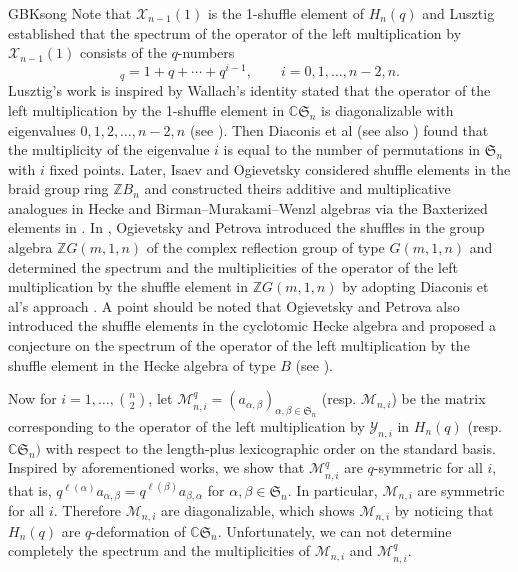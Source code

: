 \documentclass[13pt,a4paper, oneside]{amsart}       %
\numberwithin{equation}{section}
\theoremstyle{definition}
\theoremstyle{remark}
\begin{document}
\begin{CJK*}{GBK}{song}
Note that $\mathscr{X}_{n-1}(1)$ is the 1-shuffle element of $H_n(q)$ and Lusztig \cite{Lusztig} established that the spectrum of the operator of the left multiplication by $\mathscr{X}_{n-1}(1)$ consists of the $q$-numbers
 \begin{equation*}
[i]_q=1+q+\cdots+q^{i-1},\qquad i=0,1,\ldots,n-2,n.
\end{equation*}
Lusztig's work is inspired by Wallach's identity stated that the operator of the left multiplication by the 1-shuffle element in $\mathbb{C}\mathfrak{S}_n$ is diagonalizable with eigenvalues $0,1,2,\ldots, n-2,n$ (see \cite[Proposition~A.1]{Wallach}). Then Diaconis et al \cite{Diaconis-Fill-Pitman} (see also \cite{Phatarfod}) found that the multiplicity of the eigenvalue $i$ is equal to the number of permutations in $\mathfrak{S}_n$ with $i$ fixed points. Later, Isaev and Ogievetsky considered shuffle elements in the braid group ring $\mathbb{Z}B_n$ and constructed theirs additive and multiplicative analogues in Hecke and Birman--Murakami--Wenzl algebras via the Baxterized elements in \cite{Isaev-O}. In \cite{O-Petrova}, Ogievetsky and Petrova introduced the shuffles in the group algebra $\mathbb{Z}G(m,1,n)$ of the complex reflection group of type $G(m,1,n)$ and determined the spectrum and the multiplicities of the operator of the left multiplication by the shuffle element in $\mathbb{Z}G(m,1,n)$
by adopting Diaconis et al's approach \cite{Diaconis-Fill-Pitman}. A point should be noted that Ogievetsky and Petrova also introduced the shuffle elements in the cyclotomic Hecke algebra and proposed a conjecture on the spectrum of the operator of the left multiplication by the shuffle element in the Hecke algebra of type $B$ (see \cite[Conjecture~]{O-Petrova}).

Now for $i=1,\ldots,\binom{n}{2}$, let $\mathscr{M}^q_{n,i}=(a_{\alpha,\beta})_{\alpha,\beta\in\mathfrak{S}_n}$ (resp.  $\mathscr{M}_{n,i}$) be the matrix corresponding to the operator of the left multiplication by $\mathscr{Y}_{n,i}$ in $H_n(q)$ (resp. $\mathbb{C}\mathfrak{S}_n)$ with respect to the length-plus lexicographic order on the standard basis. Inspired by aforementioned works, we show that $\mathscr{M}^q_{n,i}$ are $q$-symmetric for all $i$, that is, $q^{\ell(\alpha)}a_{\alpha,\beta}=q^{\ell(\beta)}a_{\beta,\alpha}$ for $\alpha,\beta\in\mathfrak{S}_n$. In particular, $\mathscr{M}_{n,i}$ are symmetric for all $i$. Therefore $\mathscr{M}_{n,i}$ are diagonalizable, which shows $\mathscr{M}_{n,i}$ by noticing that $H_n(q)$ are $q$-deformation of $\mathbb{C}\mathfrak{S}_n$. Unfortunately, we can not determine completely the spectrum and the multiplicities of $\mathscr{M}_{n,i}$ and $\mathscr{M}^q_{n,i}$.


\end{CJK*}
\end{document}
